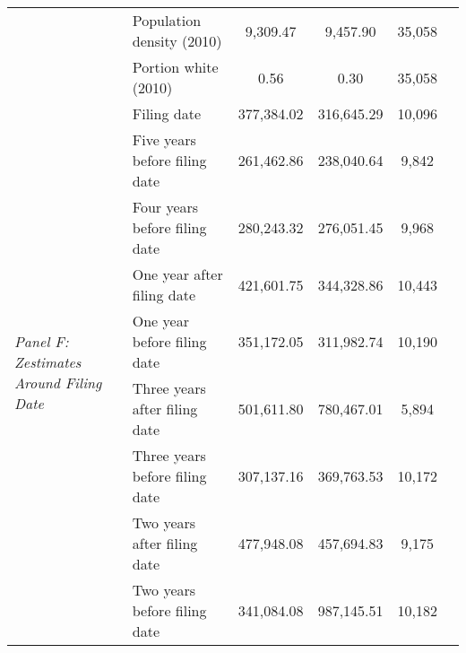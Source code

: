 \begin{tabular}{llcccc}
 & Population density (2010) & 9,309.47 & 9,457.90 & 35,058 \\
 & Portion white (2010) & 0.56 & 0.30 & 35,058 \\
\cline{1-5}
\multirow[c]{9}{4cm}{\textit{Panel F: Zestimates Around Filing Date}} & Filing date & 377,384.02 & 316,645.29 & 10,096 \\
 & Five years before filing date & 261,462.86 & 238,040.64 & 9,842 \\
 & Four years before filing date & 280,243.32 & 276,051.45 & 9,968 \\
 & One year after filing date & 421,601.75 & 344,328.86 & 10,443 \\
 & One year before filing date & 351,172.05 & 311,982.74 & 10,190 \\
 & Three years after filing date & 501,611.80 & 780,467.01 & 5,894 \\
 & Three years before filing date & 307,137.16 & 369,763.53 & 10,172 \\
 & Two years after filing date & 477,948.08 & 457,694.83 & 9,175 \\
 & Two years before filing date & 341,084.08 & 987,145.51 & 10,182 \\
\cline{1-5}
\bottomrule
\end{tabular}
